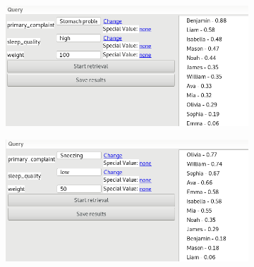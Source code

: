 \documentclass[a4paper]{article}
\begin{document}
\begin{enumerate}[label=\alph*)]
            
            \begin{figure}[H]
                \centering
                \hfill
                \begin{subfigure}{.47\itemizewidth}%
                    \includegraphics[width=\linewidth]{retrieval1.png}
                    \caption{}
                    \label{fig:retrieval1}
                \end{subfigure}
                \hspace{0.05\itemizewidth}
                \begin{subfigure}{.47\itemizewidth}%
                    \includegraphics[width=\linewidth]{retrieval2.png}
                    \caption{}
                \end{subfigure}

                \vspace{5mm}


\end{figure}
\end{enumerate}
\end{document}
